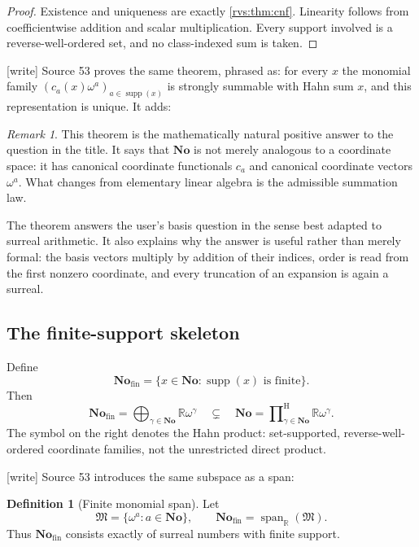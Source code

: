 \documentclass[11pt,letterpaper]{article}
\numberwithin{equation}{section}
\theoremstyle{definition}
\newtheorem{definition}[theorem]{Definition}
\theoremstyle{remark}
\newtheorem{remark}[theorem]{Remark}
\newcommand{\No}{\mathbf{No}}
\newcommand{\R}{\mathbb{R}}
\newcommand{\M}{\mathfrak{M}}
\newcommand{\Fin}{\No_{\mathrm{fin}}}
\newcommand{\supp}{\operatorname{supp}}
\newcommand{\Span}{\operatorname{span}}
\newcommand{\classprod}{\mathop{\prod}\nolimits^{\mathrm H}}
\newcommand{\wtag}{\textup{[write]}}%
\begin{document}
\begin{proof}
Existence and uniqueness are exactly \cref{rvs:thm:cnf}.  Linearity follows from
coefficientwise addition and scalar multiplication.  Every support involved
is a reverse-well-ordered set, and no class-indexed sum is taken.
\end{proof}

\noindent\wtag{} Source 53 proves the same theorem, phrased as: for every
\(x\) the monomial family \((c_a(x)\omega^a)_{a\in\supp(x)}\) is strongly
summable with Hahn sum \(x\), and this representation is unique.  It adds:

\begin{remark}
This theorem is the mathematically natural positive answer to the question in the
title. It says that $\No$ is not merely analogous to a coordinate space: it has
canonical coordinate functionals $c_a$ and canonical coordinate vectors $\omega^a$.
What changes from elementary linear algebra is the admissible summation law.
\end{remark}
The theorem answers the user's basis question in the sense best adapted to
surreal arithmetic.  It also explains why the answer is useful rather than
merely formal: the basis vectors multiply by addition of their indices, order
is read from the first nonzero coordinate, and every truncation of an
expansion is again a surreal.

\subsection{The finite-support skeleton}\label{rvs:subsec:finite-skeleton}

Define
\begin{equation}\label{rvs:eq:fin-def}
 \Fin=\{x\in\No:\supp(x)\text{ is finite}\}.
\end{equation}
Then
\begin{equation}\label{rvs:eq:direct-vs-hahn}
 \Fin=\bigoplus_{\gamma\in\No}\R\omega^\gamma
 \quad\subsetneq\quad
 \No=\classprod_{\gamma\in\No}\R\omega^\gamma.
\end{equation}
The symbol on the right denotes the Hahn product: set-supported,
reverse-well-ordered coordinate families, not the unrestricted direct
product.


\noindent\wtag{} Source 53 introduces the same subspace as a span:

\begin{definition}[Finite monomial span]
Let
\[
  \M=\{\omega^a:a\in\No\},\qquad
  \Fin=\Span_{\R}(\M).
\]
Thus $\Fin$ consists exactly of surreal numbers with finite support.
\end{definition}
\end{document}
